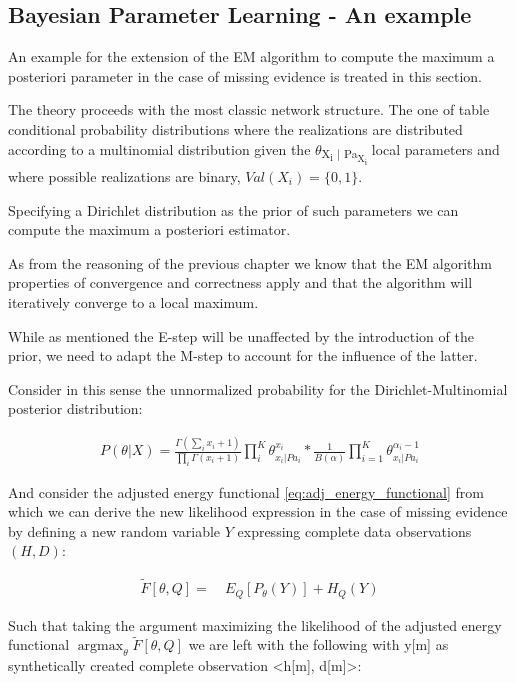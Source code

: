 \documentclass[11pt]{article}
\begin{document}
\subsection{Bayesian Parameter Learning - An example}
\label{sec:orga712e48}

An example for the extension of the EM algorithm to compute the
maximum a posteriori parameter in the case of missing evidence is
treated in this section.

The theory proceeds with the most classic network structure. The
one of table conditional probability distributions where the
realizations are distributed according to a multinomial
distribution given the \(\theta\)\textsubscript{X\textsubscript{i} | Pa\textsubscript{X\textsubscript{i}}} local parameters and
where possible realizations are binary, \(Val(X_i) = \{0,1 \}\).

Specifying a Dirichlet distribution as the prior of such parameters
we can compute the maximum a posteriori estimator.

As from the reasoning of the previous chapter we know that the EM
algorithm properties of convergence and correctness apply and that
the algorithm will iteratively converge to a local maximum.

While as mentioned the E-step will be unaffected by the
introduction of the prior, we need to adapt the M-step to account
for the influence of the latter.

Consider in this sense the unnormalized probability for the
Dirichlet-Multinomial posterior distribution:

\begin{align} \label{eq:dirichlet-multinomial-score}
P(\theta | X) = \frac{\Gamma(\sum_i x_i + 1)}{\prod_i \Gamma(x_i + 1)} \prod_i^K \theta_{x_i | Pa_i}^{x_i}  * \frac{1}{B(\alpha)} \prod_{i=1}^K \theta_{x_i | Pa_i}^{\alpha_i - 1}
\end{align}

And consider the adjusted energy functional
\ref{eq:adj_energy_functional} from which we can derive the new
likelihood expression in the case of missing evidence by defining a
new random variable \(Y\) expressing complete data observations
\((H, D)\):

\begin{align} \label{eq:dirichlet-multinomial-likelihood}
\tilde{F}[\theta, Q] =& \ E_Q[P_\theta(Y)] + H_Q (Y)
\end{align}

Such that taking the argument maximizing the likelihood of the
adjusted energy functional \(\operatorname*{argmax}_{\theta}
   \tilde{F}[\theta, Q]\) we are left with the following with y[m] as
synthetically created complete observation <h[m], d[m]>:
\end{document}
